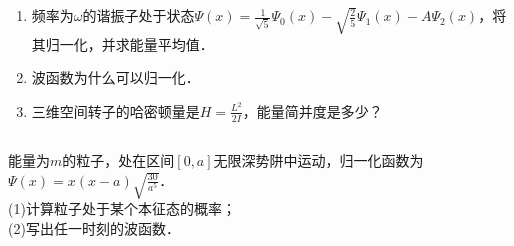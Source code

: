
\subsection{ }
\begin{enumerate}
\item 频率为$\omega$的谐振子处于状态$\varPsi (x)=\frac{1}{\sqrt{5}}\varPsi_{0} (x)-\sqrt{\frac{2}{5}}\varPsi_{1} (x)-A\varPsi_2 (x)$，将其归一化，并求能量平均值．
\item 波函数为什么可以归一化．
\item 三维空间转子的哈密顿量是$H=\frac{L^{2}}{2I}$，能量简并度是多少？
\end{enumerate}
\subsection{ }
能量为$m$的粒子，处在区间$[0,a]$无限深势阱中运动，归一化函数为$\varPsi (x)=x(x-a)\sqrt{\frac{30}{a^{5}}}$．\\
(1)计算粒子处于某个本征态的概率；\\
(2)写出任一时刻的波函数．

